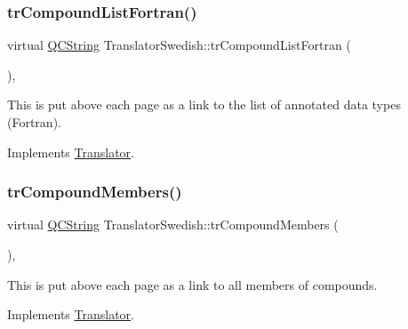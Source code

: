 \mbox{\label{class_translator_swedish_a9a0284ecdb2069202d7792286bf403d6}} 
\subsubsection{\texorpdfstring{trCompoundListFortran()}{trCompoundListFortran()}}
{\footnotesize\ttfamily virtual \mbox{\hyperlink{class_q_c_string}{Q\+C\+String}} Translator\+Swedish\+::tr\+Compound\+List\+Fortran (\begin{DoxyParamCaption}{ }\end{DoxyParamCaption})\hspace{0.3cm}{\ttfamily [inline]}, {\ttfamily [virtual]}}

This is put above each page as a link to the list of annotated data types (Fortran). 

Implements \mbox{\hyperlink{class_translator}{Translator}}.

\mbox{\label{class_translator_swedish_a34ff9c511a24d101f4f88cbc03148f32}} 
\subsubsection{\texorpdfstring{trCompoundMembers()}{trCompoundMembers()}}
{\footnotesize\ttfamily virtual \mbox{\hyperlink{class_q_c_string}{Q\+C\+String}} Translator\+Swedish\+::tr\+Compound\+Members (\begin{DoxyParamCaption}{ }\end{DoxyParamCaption})\hspace{0.3cm}{\ttfamily [inline]}, {\ttfamily [virtual]}}

This is put above each page as a link to all members of compounds. 

Implements \mbox{\hyperlink{class_translator}{Translator}}.

\mbox{\label{class_translator_swedish_a82692747309d130b63503325cf632806}} 
